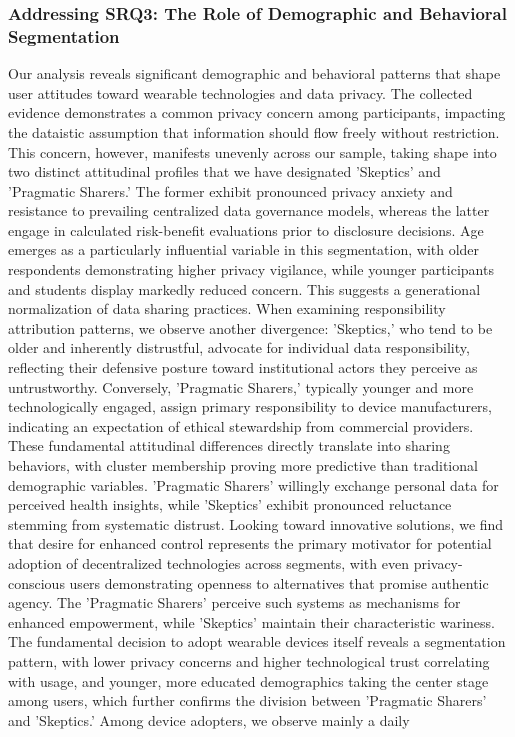 	\subsubsection{Addressing SRQ3: The Role of Demographic and Behavioral Segmentation}
	Our analysis reveals significant demographic and behavioral patterns that shape user attitudes toward wearable technologies and data privacy. The collected evidence demonstrates a common privacy concern among participants, impacting the dataistic assumption that information should flow freely without restriction. This concern, however, manifests unevenly across our sample, taking shape into two distinct attitudinal profiles that we have designated 'Skeptics' and 'Pragmatic Sharers.' The former exhibit pronounced privacy anxiety and resistance to prevailing centralized data governance models, whereas the latter engage in calculated risk-benefit evaluations prior to disclosure decisions. Age emerges as a particularly influential variable in this segmentation, with older respondents demonstrating higher privacy vigilance, while younger participants and students display markedly reduced concern. This suggests a generational normalization of data sharing practices. When examining responsibility attribution patterns, we observe another divergence: 'Skeptics,' who tend to be older and inherently distrustful, advocate for individual data responsibility, reflecting their defensive posture toward institutional actors they perceive as untrustworthy. Conversely, 'Pragmatic Sharers,' typically younger and more technologically engaged, assign primary responsibility to device manufacturers, indicating an expectation of ethical stewardship from commercial providers. These fundamental attitudinal differences directly translate into sharing behaviors, with cluster membership proving more predictive than traditional demographic variables. 'Pragmatic Sharers' willingly exchange personal data for perceived health insights, while 'Skeptics' exhibit pronounced reluctance stemming from systematic distrust. Looking toward innovative solutions, we find that desire for enhanced control represents the primary motivator for potential adoption of decentralized technologies across segments, with even privacy-conscious users demonstrating openness to alternatives that promise authentic agency. The 'Pragmatic Sharers' perceive such systems as mechanisms for enhanced empowerment, while 'Skeptics' maintain their characteristic wariness. The fundamental decision to adopt wearable devices itself reveals a segmentation pattern, with lower privacy concerns and higher technological trust correlating with usage, and younger, more educated demographics taking the center stage among users, which further confirms the division between 'Pragmatic Sharers' and 'Skeptics.' Among device adopters, we observe mainly a daily 